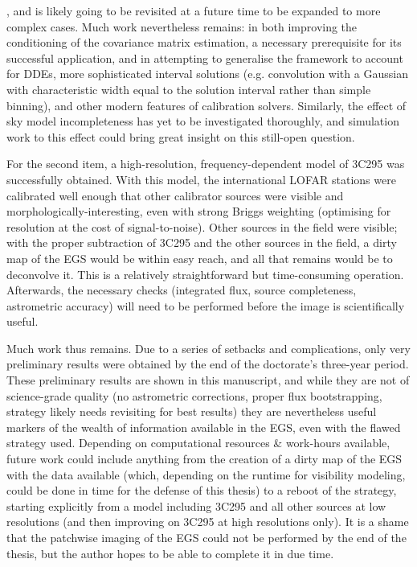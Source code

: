 , and is likely going to be revisited at a future time to be expanded to more complex cases. Much work nevertheless remains: in both improving the conditioning of the covariance matrix estimation, a necessary prerequisite for its successful application, and in attempting to generalise the framework to account for DDEs, more sophisticated interval solutions (e.g. convolution with a Gaussian with characteristic width equal to the solution interval rather than simple binning), and other modern features of calibration solvers. Similarly, the effect of sky model incompleteness has yet to be investigated thoroughly, and simulation work to this effect could bring great insight on this still-open question.

\pg
For the second item, a high-resolution, frequency-dependent model of 3C295 was successfully obtained. With this model, the international LOFAR stations were calibrated well enough that other calibrator sources were visible and morphologically-interesting, even with strong Briggs weighting (optimising for resolution at the cost of signal-to-noise). Other sources in the field were visible; with the proper subtraction of 3C295 and the other sources in the field, a dirty map of the EGS would be within easy reach, and all that remains would be to deconvolve it. This is a relatively straightforward but time-consuming operation. Afterwards, the necessary checks (integrated flux, source completeness, astrometric accuracy) will need to be performed before the image is scientifically useful. 


\pg
Much work thus remains. Due to a series of setbacks and complications, only very preliminary results were obtained by the end of the doctorate's three-year period. These preliminary results are shown in this manuscript, and while they are not of science-grade quality (no astrometric corrections, proper flux bootstrapping, strategy likely needs revisiting for best results) they are nevertheless useful markers of the wealth of information available in the EGS, even with the flawed strategy used. Depending on computational resources \& work-hours available, future work could include anything from the creation of a dirty map of the EGS with the data available (which, depending on the runtime for visibility modeling, could be done in time for the defense of this thesis) to a reboot of the strategy, starting explicitly from a model including 3C295 and all other sources at low resolutions (and then improving on 3C295 at high resolutions only). It is a shame that the patchwise imaging of the EGS could not be performed by the end of the thesis, but the author hopes to be able to complete it in due time.

%

